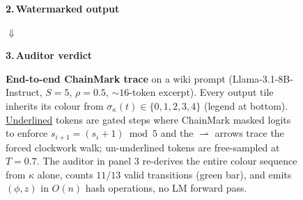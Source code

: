 \begin{figure}[t]
\begin{minipage}{\columnwidth}
    {\small\bfseries 2.\,Watermarked output}\par
    \vspace{1pt}%
    \noindent{}\par
    \vspace{2pt}\centerline{\textcolor{auditred}{\small$\Downarrow$}}\vspace{1pt}%

    {\small\bfseries 3.\,Auditor verdict}\par
    \vspace{1pt}%
    \noindent{}\par
    \vspace{3pt}%

    \noindent\centerline{%
      \tarr{}\tarr{}\tarr{}\tarr{}\tarr{}%
    }%
  \end{minipage}
  \caption{\textbf{End-to-end ChainMark trace} on a wiki prompt
    (Llama-3.1-8B-Instruct, $S{=}5$, $\rho{=}0.5$, $\sim\!16$-token
    excerpt). Every output tile inherits its colour from
    $\sigma_\kappa(t)\in\{0,1,2,3,4\}$ (legend at bottom).
    \underline{Underlined} tokens are gated steps where ChainMark
    masked logits to enforce $s_{i{+}1}{=}(s_i{+}1)\bmod 5$ and the
    \textcolor{cmblue}{$\rightharpoonup$} arrows trace the forced
    clockwork walk; un-underlined tokens are free-sampled at
    $T{=}0.7$. The auditor in panel 3 re-derives the entire colour
    sequence from $\kappa$ alone, counts $11/13$ valid transitions
    (green bar), and emits $(\phi, z)$ in $O(n)$ hash operations,
    no LM forward pass.}
  \label{fig:experiment-flow}
\end{figure}

